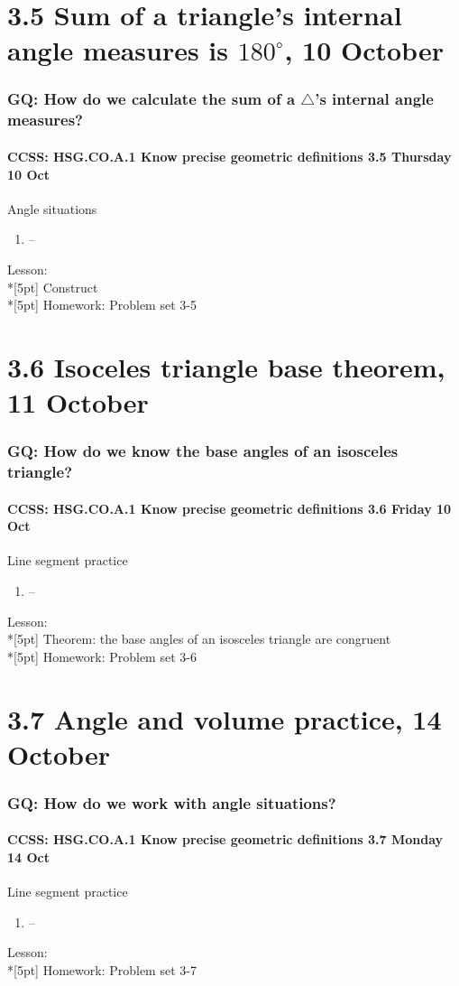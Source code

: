 \documentclass{beamer}
\begin{document}
  \section{3.5 Sum of a triangle's internal angle measures is $180^\circ$, 10 October}
    \frame
    {
      \frametitle{GQ: How do we calculate the sum of a $\triangle$'s internal angle measures?}
      \framesubtitle{CCSS: HSG.CO.A.1 Know precise geometric definitions \hfill \alert{3.5 Thursday 10 Oct}}

      \begin{block}{Angle situations}
      \begin{enumerate}
        \item --
      \end{enumerate}
      \end{block}
      Lesson:   \\*[5pt]
      Construct\\*[5pt]
      Homework: Problem set 3-5
    }

  \section{3.6 Isoceles triangle base theorem, 11 October}
    \frame
    {
      \frametitle{GQ: How do we know the base angles of an isosceles triangle?}
      \framesubtitle{CCSS: HSG.CO.A.1 Know precise geometric definitions \hfill \alert{3.6 Friday 10 Oct}}

      \begin{block}{Line segment practice}
      \begin{enumerate}
        \item --
      \end{enumerate}
      \end{block}
      Lesson:   \\*[5pt]
      Theorem: the base angles of an isosceles triangle are congruent\\*[5pt]
      Homework: Problem set 3-6
    }

  \section{3.7 Angle and volume practice, 14 October}
    \frame
    {
      \frametitle{GQ: How do we work with angle situations?}
      \framesubtitle{CCSS: HSG.CO.A.1 Know precise geometric definitions \hfill \alert{3.7 Monday 14 Oct}}

      \begin{block}{Line segment practice}
      \begin{enumerate}
        \item --
      \end{enumerate}
      \end{block}
      Lesson:   \\*[5pt]
      Homework: Problem set 3-7
    }
\end{document}
